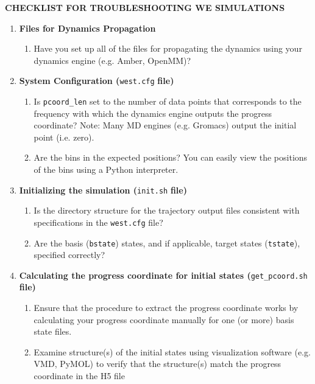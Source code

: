 \documentclass[9pt,tutorial,ASAPversion]{livecoms}
\begin{document}
\newpage
\begin{center}
\begin{LARGE}
    \textbf{CHECKLIST FOR TROUBLESHOOTING WE SIMULATIONS}
\end{LARGE}
\end{center}

\renewcommand{\labelenumi}{}
\renewcommand{\labelenumii}{$\square$}
\begin{enumerate}
\item \textbf{Files for Dynamics Propagation}
\begin{enumerate}
\item Have you set up all of the files for propagating the dynamics using your dynamics engine (e.g. Amber, OpenMM)? 
\end{enumerate}
\item \textbf{System Configuration (}\verb|west.cfg| \textbf{file)}
\begin{enumerate}
\item Is \verb|pcoord_len| set to the number of data points that corresponds to the frequency with which the dynamics engine outputs the progress coordinate? Note: Many MD engines (e.g. Gromacs) output the initial point (i.e. zero). 
\item Are the bins in the expected positions? You can easily view the positions of the bins using a Python interpreter.
\end{enumerate}
\item \textbf{Initializing the simulation (}\verb|init.sh| \textbf{file)} 
\begin{enumerate}
\item Is the directory structure for the trajectory output files consistent with specifications in the \verb|west.cfg| file? 
\item Are the basis (\verb|bstate|) states, and if applicable, target states (\verb|tstate|), specified correctly?
\end{enumerate}
\item \textbf{Calculating the progress coordinate for initial states (}\verb|get_pcoord.sh| \textbf{file)}
\begin{enumerate}
\item Ensure that the procedure to extract the progress coordinate works by calculating your progress coordinate manually for one (or more) basis state files. 
\item Examine structure(s) of the initial states using visualization software (e.g. VMD, PyMOL) to verify that the structure(s) match the progress coordinate in the H5 file 

\end{enumerate}
\end{enumerate}
\end{document}
